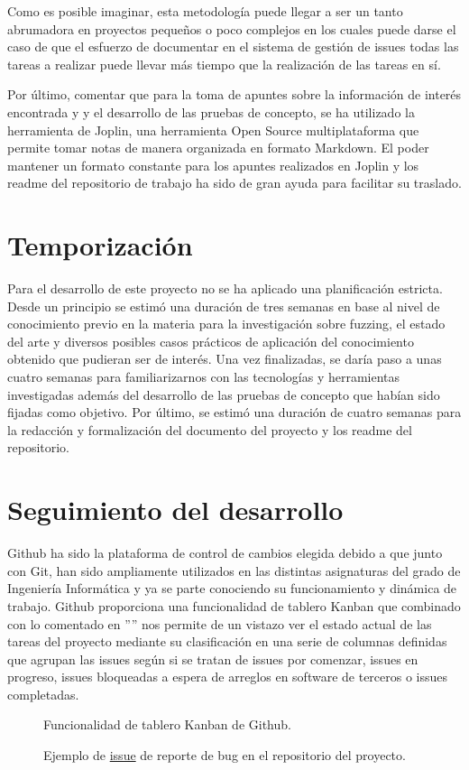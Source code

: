 Como es posible imaginar, esta metodología puede llegar a ser un tanto abrumadora en proyectos pequeños o poco 
complejos en los cuales puede darse el caso de que el esfuerzo de documentar en el sistema de gestión de issues 
todas las tareas a realizar puede llevar más tiempo que la realización de las tareas en sí.

Por último, comentar que para la toma de apuntes sobre la información de interés encontrada y y el desarrollo de 
las pruebas de concepto, se ha utilizado la herramienta de Joplin, una herramienta Open Source multiplataforma que 
permite tomar notas de manera organizada en formato Markdown. El poder mantener un formato constante para los apuntes
realizados en Joplin y los readme del repositorio de trabajo ha sido de gran ayuda para facilitar su traslado.

\section{Temporización}
Para el desarrollo de este proyecto no se ha aplicado una planificación estricta. Desde un principio se estimó una 
duración de tres semanas en base al nivel de conocimiento previo en la materia para la investigación sobre fuzzing,
el estado del arte y diversos posibles casos prácticos
de aplicación del conocimiento obtenido que pudieran ser de interés. Una vez finalizadas, se daría paso a unas cuatro 
semanas para familiarizarnos con las tecnologías y herramientas investigadas además del desarrollo de las pruebas de 
concepto que habían sido fijadas como objetivo. Por último, se estimó una duración de cuatro semanas para la redacción 
y formalización del documento del proyecto y los readme del repositorio.

\section{Seguimiento del desarrollo}
\label{seguimiento}
Github ha sido la plataforma de control de cambios elegida debido a que junto con Git, han sido ampliamente utilizados
en las distintas asignaturas del grado de Ingeniería Informática y ya se parte conociendo su funcionamiento y dinámica de 
trabajo. Github proporciona una funcionalidad de tablero Kanban que combinado con lo comentado en ''''
nos permite de un vistazo ver el estado actual de las tareas del proyecto mediante su clasificación en una serie de columnas 
definidas que agrupan las issues según si se tratan de issues por comenzar, issues en progreso, issues bloqueadas a espera 
de arreglos en software de terceros o issues completadas.
\begin{figure}
    \vspace*{-2.8in}
    \caption{Funcionalidad de tablero Kanban de Github.}
\end{figure}

\begin{figure}
    \vspace*{-2.8in}
    \caption{Ejemplo de \href{https://github.com/Olasergiolas/TFG/issues/11}{issue} de reporte de bug en el repositorio del proyecto.}
\end{figure}
